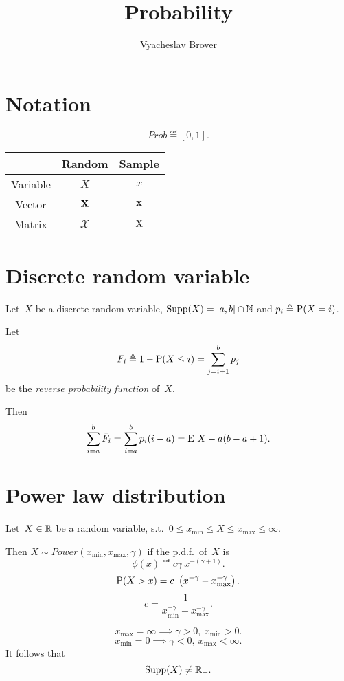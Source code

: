 \documentclass[10pt,a4paper]{article}
\title{Probability}
\author{Vyacheslav Brover}
\theoremstyle{plain} \newtheorem{Lem}{Lemma}
\begin{document}
\maketitle
\tableofcontents


\section{Notation}

$$ Prob \eqdef [0,1]. $$

\begin{tabular}{|c|c|c|}
\hline & Random & Sample \\
\hline 
\hline Variable & $X$ & $x$ \\
\hline Vector   & $\ve X$ & $\ve x$ \\
\hline Matrix   & $\mathcal X$ & $\mat X$ \\
\hline
\end{tabular}


\section{Discrete random variable}
Let~$X$ be a discrete random variable, $\supp(X) = [a,b]\cap \N$ and $p_i \eqdef \P(X=i)$.

Let 
$$\bar F_i \eqdef 1 - \P(X \le i) = \sum_{j=i+1}^b p_j$$
be the {\em reverse probability function} of~$X$.

Then
\begin{equation}
 \sum_{i=a}^b \bar F_i = \sum_{i=a}^b p_i (i-a) = \E X - a (b-a+1).  \label{sum_rev_pf}
\end{equation}



\section {Power law distribution}

Let~$X \in \R$ be a random variable, s.t.~$0 \le x_{\mathrm {min}} \le X \le x_{\mathrm {max}} \le \infty $.

Then $X \sim Power(x_{\mathrm {min}},x_{\mathrm {max}},\gamma)$ if the p.d.f.~of~$X$ is
$$ \phi(x) \eqdef c \gamma \ x^{- (\gamma + 1)}. $$
$$ \P(X > x) = c \ \left(x^{-\gamma} - x_{\mathrm {max}}^{-\gamma} \right). $$
$$ c = \frac 1 {x_{\mathrm {min}}^{-\gamma} - x_{\mathrm {max}}^{-\gamma}}. $$

$$ x_{\mathrm {max}} = \infty \implies \gamma > 0, \ x_{\mathrm {min}} > 0. $$
$$ x_{\mathrm {min}} = 0 \implies \gamma < 0, \ x_{\mathrm {max}} < \infty. $$
It follows that
$$ \supp(X) \ne \R_+. $$
\end{document}
